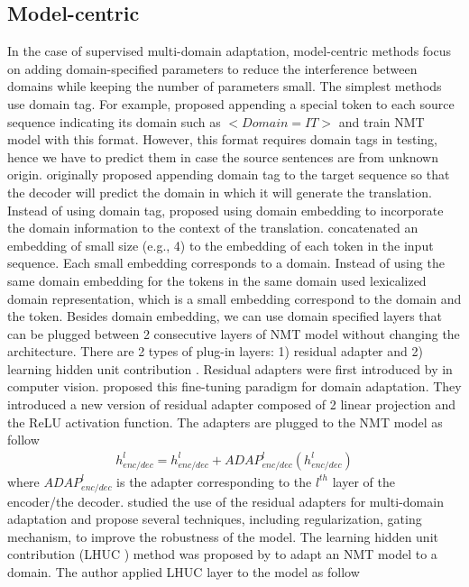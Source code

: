 \subsection{Model-centric}
In the case of supervised multi-domain adaptation, model-centric methods focus on adding domain-specified parameters to reduce the interference between domains while keeping the number of parameters small. The simplest methods use domain tag. For example, \citet{Kobus17domain} proposed appending a special token to each source sequence indicating its domain such as $<Domain=IT>$ and train NMT model with this format. However, this format requires domain tags in testing, hence we have to predict them in case the source sentences are from unknown origin. \cite{Britz17effective} originally proposed appending domain tag to the target sequence so that the decoder will predict the domain in which it will generate the translation. Instead of using domain tag, \citep{Kobus17domain, Pham19generic} proposed using domain embedding to incorporate the domain information to the context of the translation. \citet{Kobus17domain} concatenated an embedding of small size (e.g., 4) to the embedding of each token in the input sequence. Each small embedding corresponds to a domain. Instead of using the same domain embedding for the tokens in the same domain \citet{Pham19generic} used lexicalized domain representation, which is a small embedding correspond to the domain and the token. Besides domain embedding, we can use domain specified layers that can be plugged between 2 consecutive layers of NMT model without changing the architecture. There are 2 types of plug-in layers: 1) residual adapter \citep{Bapna19simple, Pham20Study} and 2) learning hidden unit contribution \citep{Vilar18learning}. Residual adapters were first introduced by \citet{Rebuffi17learning} in computer vision. \citet{Bapna19simple} proposed this fine-tuning paradigm for domain adaptation. They introduced a new version of residual adapter composed of 2 linear projection and the ReLU activation function. The adapters are plugged to the NMT model as follow
\begin{equation}
\begin{array}{rcl}
h_{enc/dec}^l = h_{enc/dec}^{l} + ADAP_{enc/dec}^l(h_{enc/dec}^{l})
\end{array}
\end{equation}
where $ADAP_{enc/dec}^l$ is the adapter corresponding to the $l^{th}$ layer of the encoder/the decoder. \cite{Pham20Study} studied the use of the residual adapters for multi-domain adaptation and propose several techniques, including regularization, gating mechanism, to improve the robustness of the model. The learning hidden unit contribution (LHUC ) method was proposed by \cite{Vilar18learning} to adapt an NMT model to a domain. The author applied LHUC layer to the model as follow
